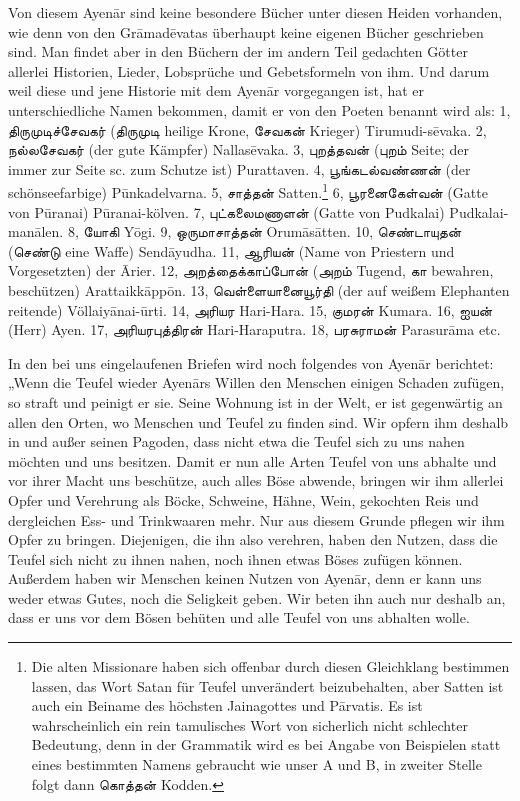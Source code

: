 \documentclass{article}
\newcommand{\TamilText}[1]{\texttamil{#1}}
\newcommand{\tam}[1]{\TamilText{#1}}
\begin{document}
Von diesem Ayen\={a}r sind keine besondere Bücher unter diesen Heiden vorhanden, wie denn von den Gr\={a}mad\={e}vatas überhaupt keine eigenen Bücher geschrieben sind. Man findet aber in den Büchern der im andern Teil gedachten Götter allerlei Historien, Lieder, Lobsprüche und Gebetsformeln von ihm. Und darum weil diese und jene Historie mit dem Ayen\={a}r vorgegangen ist, hat er unterschiedliche Namen bekommen, damit er von den Poeten benannt wird als: 1, \tam{திருமுடிச்சேவகர்} (\tam{திருமுடி} heilige Krone, \tam{சேவகன்} Krieger) Tirumudi-s\={e}vaka. 2, \tam{நல்லசேவகர்} (der gute Kämpfer) Nallas\={e}vaka. 3, \tam{புறத்தவன்} (\tam{புறம்} Seite; der immer zur Seite sc. zum Schutze ist) Purattaven. 4, \tam{பூங்கடல்வண்ணன்} (der schönseefarbige) P\={u}nkadelvarna. 5, \tam{சாத்தன்} Satten.\footnote{Die alten Missionare haben sich offenbar durch diesen Gleichklang bestimmen lassen, das Wort Satan für Teufel unverändert beizubehalten, aber Satten ist auch ein Beiname des höchsten Jainagottes und P\={a}rvatis. Es ist wahrscheinlich ein rein tamulisches Wort von sicherlich nicht schlechter Bedeutung, denn in der Grammatik wird es bei Angabe von Beispielen statt eines bestimmten Namens gebraucht wie unser A und B, in zweiter Stelle folgt dann \tam{கொத்தன்} Kodden.} 6, \tam{பூரனைகேள்வன்} (Gatte von P\={u}ranai) P\={u}ranai-kölven. 7, \tam{புட்கலைமணாளன்} (Gatte von Pudkalai) Pudkalai-man\={a}len. 8, \tam{யோகி} Y\={o}gi. 9, \tam{ஒருமாசாத்தன்} Orum\={a}s\={a}tten. 10, \tam{செண்டாயுதன்} (\tam{செண்டு} eine Waffe) Send\={a}yudha. 11, \tam{ஆரியன்} (Name von Priestern und Vorgesetzten) der \={A}rier. 12, \tam{அறத்தைக்காப்போன்} (\tam{அறம்} Tugend, \tam{கா} bewahren, beschützen) Arattaikk\={a}pp\={o}n. 13, \tam{வெள்ளையானையூர்தி} (der auf weißem Elephanten reitende) Völlaiy\={a}nai-\={u}rti. 14, \tam{அரியர} Hari-Hara. 15, \tam{குமரன்} Kumara. 16, \tam{ஐயன்} (Herr) Ayen. 17, \tam{அரியரபுத்திரன்} Hari-Haraputra. 18, \tam{பரசுராமன்} Parasur\={a}ma etc.

In den bei uns eingelaufenen Briefen wird noch folgendes von Ayen\={a}r berichtet: „Wenn die Teufel wieder Ayen\={a}rs Willen den Menschen einigen Schaden zufügen, so straft und peinigt er sie. Seine Wohnung ist in der Welt, er ist gegenwärtig an allen den Orten, wo Menschen und Teufel zu finden sind. Wir opfern ihm deshalb in und außer seinen Pagoden, dass nicht etwa die Teufel sich zu uns nahen möchten und uns besitzen. Damit er nun alle Arten Teufel von uns abhalte und vor ihrer Macht uns beschütze, auch alles Böse abwende, bringen wir ihm allerlei Opfer und Verehrung als Böcke, Schweine, Hähne, Wein, gekochten Reis und dergleichen Ess- und Trinkwaaren mehr. Nur aus diesem Grunde pflegen wir ihm Opfer zu bringen. Diejenigen, die ihn also verehren, haben den Nutzen, dass die Teufel sich nicht zu ihnen nahen, noch ihnen etwas Böses zufügen können. Außerdem haben wir Menschen keinen Nutzen von Ayen\={a}r, denn er kann uns weder etwas Gutes, noch die Seligkeit geben. Wir beten ihn auch nur deshalb an, dass er uns vor dem Bösen behüten und alle Teufel von uns abhalten wolle.
\end{document}
